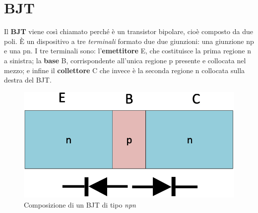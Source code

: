 \documentclass[12pt, a4paper]{report}
\begin{document}
\chapter{BJT}
Il \textbf{BJT} viene così chiamato perché è un transistor bipolare, cioè composto da due poli. È un dispositivo a tre \textit{terminali} formato due due giunzioni: una giunzione np e una pn. I tre terminali sono: l'\textbf{emettitore} E, che costituisce la prima regione n a sinistra; la \textbf{base} B, corrispondente all'unica regione p presente e collocata nel mezzo; e infine il \textbf{collettore} C che invece è la seconda regione n collocata sulla destra del BJT.
\begin{figure}[h]
    \centering
    \includegraphics[scale=0.4,angle=0]{bjt_iniziale.png}
    \caption{Composizione di un BJT di tipo \textit{npn}}
    \label{bjt}
\end{figure}
\end{document}
